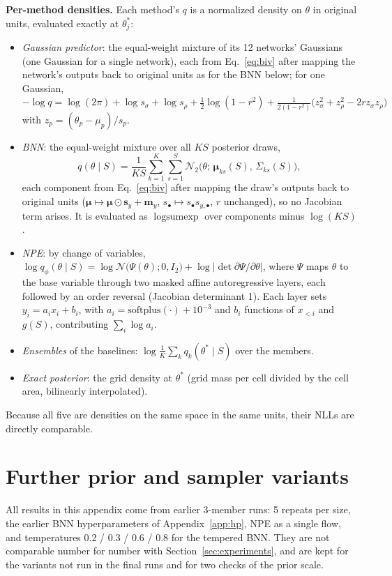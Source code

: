 \documentclass[11pt]{article}
\begin{document}
\textbf{Per-method densities.} Each method's $q$ is a normalized
density on $\theta$ in original units, evaluated exactly at $\theta^\ast_j$:
\begin{itemize}
\item \emph{Gaussian predictor}: the equal-weight mixture of its 12 networks' Gaussians (one Gaussian for a single
  network), each from Eq.~\eqref{eq:biv} after mapping the network's outputs back to original units as for
  the BNN below; for one Gaussian,
  $-\log q=\log(2\pi)+\log s_\sigma+\log s_\rho+\tfrac12\log(1-r^2)+\tfrac{1}{2(1-r^2)}\big(z_\sigma^2+z_\rho^2-2rz_\sigma z_\rho\big)$
  with $z_p=(\theta_p-\mu_p)/s_p$.
\item \emph{BNN}: the equal-weight mixture over all $KS$ posterior draws,
  \begin{equation}
  q(\theta\mid S)=\frac{1}{KS}\sum_{k=1}^{K}\sum_{s=1}^{S}\mathcal{N}_2\big(\theta;\,\boldsymbol\mu_{ks}(S),\,\Sigma_{ks}(S)\big),
  \end{equation}
  each component from Eq.~\eqref{eq:biv} after mapping the draw's outputs back to original units
  ($\boldsymbol\mu\mapsto\boldsymbol\mu\odot\mathbf s_y+\mathbf m_y$, $s_\bullet\mapsto s_\bullet s_{y,\bullet}$, $r$
  unchanged), so no Jacobian term arises. It is evaluated as $\operatorname{logsumexp}$ over components minus $\log(KS)$.
\item \emph{NPE}: by change of variables, $\log q_\phi(\theta\mid S)=\log\mathcal{N}\big(\Psi(\theta);0,I_2\big)+
  \log\lvert\det\partial \Psi/\partial\theta\rvert$, where $\Psi$ maps $\theta$ to the base variable through two masked
  affine autoregressive layers, each followed by an order reversal (Jacobian determinant 1). Each layer sets
  $y_i=a_i x_i+b_i$, with $a_i=\mathrm{softplus}(\cdot)+10^{-3}$ and $b_i$ functions of $x_{<i}$ and $g(S)$,
  contributing $\sum_i\log a_i$.
\item \emph{Ensembles} of the baselines: $\log\frac1K\sum_k q_k(\theta^\ast\mid S)$ over the members.
\item \emph{Exact posterior}: the grid density at $\theta^\ast$ (grid mass per cell divided by the cell area,
  bilinearly interpolated).
\end{itemize}
Because all five are densities on the same space in the same units, their NLLs are directly comparable.

\section{Further prior and sampler variants}
\label{app:variants}
All results in this appendix come from earlier 3-member runs: 5 repeats per size, the earlier BNN hyperparameters of
Appendix~\ref{app:hp}, NPE as a single flow, and temperatures 0.2 / 0.3 / 0.6 / 0.8 for the tempered BNN. They are not
comparable number for number with Section~\ref{sec:experiments}, and are kept for the variants not run in the final
runs and for two checks of the prior scale.
\end{document}

